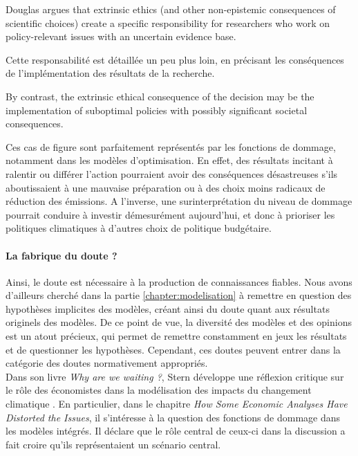 \begin{authoredquote}
    Douglas argues that extrinsic ethics (and other non-epistemic consequences of scientific choices) create a specific responsibility for researchers who work on policy-relevant issues with an uncertain evidence base. 
\end{authoredquote}

Cette responsabilité est détaillée un peu plus loin, en précisant les conséquences de l'implémentation des résultats de la recherche. 

\begin{authoredquote}
     By contrast, the extrinsic ethical consequence of the decision may be the implementation of suboptimal policies with possibly significant societal consequences.
\end{authoredquote}

Ces cas de figure sont parfaitement représentés par les fonctions de dommage, notamment dans les modèles d'optimisation. En effet, des résultats incitant à ralentir ou différer l'action pourraient avoir des conséquences désastreuses s'ils aboutissaient à une mauvaise préparation ou à des choix moins radicaux de réduction des émissions. A l'inverse, une surinterprétation du niveau de dommage pourrait conduire à investir démesurément aujourd'hui, et donc à prioriser les politiques climatiques à d'autres choix de politique budgétaire. 

\paragraph{La fabrique du doute ?}

Ainsi, le doute est nécessaire à la production de connaissances fiables. Nous avons d'ailleurs cherché dans la partie \ref{chapter:modelisation} à remettre en question des hypothèses implicites des modèles, créant ainsi du doute quant aux résultats originels des modèles. De ce point de vue, la diversité des modèles et des opinions est un atout précieux, qui permet de remettre constamment en jeux les résultats et de questionner les hypothèses. Cependant, ces doutes peuvent entrer dans la catégorie des doutes normativement appropriés. \\

Dans son livre \emph{Why are we waiting ?}, Stern développe une réflexion critique sur le rôle des économistes dans la modélisation des impacts du changement climatique \textcite{stern_why_2015}.   En particulier, dans le chapitre \emph{How Some Economic Analyses Have Distorted the Issues}, il s'intéresse à la question des fonctions de dommage dans les modèles intégrés. Il déclare que le rôle central de ceux-ci dans la discussion a fait croire qu'ils représentaient un scénario central.

